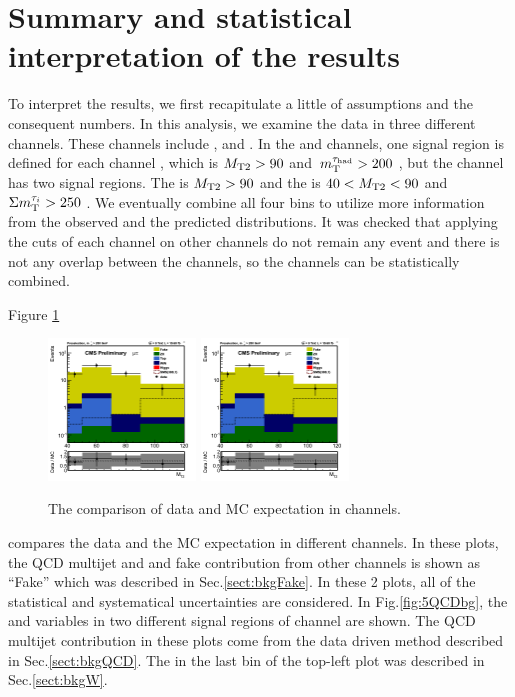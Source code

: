 \section{Summary and statistical interpretation of the results}
\label{sect:stat}
To interpret the results, we first recapitulate a little of assumptions and the consequent numbers.
In this analysis, we examine the data in three different channels.
These channels include \tauTau, \muTau and \eTau.
In the \muTau and \eTau channels, one signal region is defined for each channel , which is ${M_{\rm T2}} > 90$ \GeV and $\,m_{\rm T}^{\tau_{\rm had}} > 200$ \GeV,
but the \tauTau channel has two signal regions.
The \binone is ${M_{\rm T2}} > 90$ \GeV and the \bintwo is $40 < {M_{\rm T2}} < 90$ \GeV and $\Sigma m_{\rm T}^{\tau_i} > 250$ \GeV.
We eventually combine all four bins to utilize more information from the observed and the predicted distributions.
It was checked that applying the cuts of each channel on other channels do not remain any event and 
there is not any overlap between the channels, so the channels can be statistically combined.

Figure \ref{fig:yield_final}
\begin{figure}[h]
\centering
\includegraphics[width=0.35\textwidth,keepaspectratio=true]{StatisticsFig/MT2muTau_tauMTgt200_DDFake.png}
\includegraphics[width=0.35\textwidth,keepaspectratio=true]{StatisticsFig/MT2muTau_tauMTgt200_DDFake.png}
\caption{The comparison of data and MC expectation in \leptonTau channels.}
\label{fig:yield_final}
\end{figure}
compares the data and the MC expectation in different \leptonTau channels. 
In these plots, the QCD multijet and \wjets and fake contribution from other channels is shown 
as ``Fake'' which was described in Sec.\ref{sect:bkgFake}. 
In these 2 plots, all of the statistical and systematical uncertainties are considered.
In Fig.\ref{fig:5QCDbg}, the \mttwo and \SumMT variables in two 
different signal regions of \tauTau channel are shown. The QCD multijet contribution in these plots come from the data driven method described in 
Sec.\ref{sect:bkgQCD}. The \wjets in the last bin of the top-left plot was described in Sec.\ref{sect:bkgW}. 

